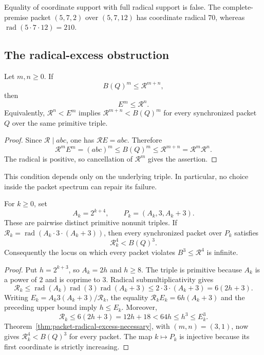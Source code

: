 Equality of coordinate support with full radical support is false.  The
complete-premise packet $(5,7,2)$ over $(5,7,12)$ has coordinate radical
$70$, whereas $\operatorname{rad}(5\cdot7\cdot12)=210$.

\subsection{The radical-excess obstruction}

\begin{theorem}
\label{thm:packet-radical-excess-necessary}
Let $m,n\ge0$.  If
\[
 B(Q)^m\le \mathcal R^{m+n},
\]
then
\[
 E^m\le \mathcal R^n.
\]
Equivalently, $\mathcal R^n<E^m$ implies
$\mathcal R^{m+n}<B(Q)^m$ for every synchronized
packet $Q$ over the same primitive triple.
\end{theorem}

\begin{proof}
Since $\mathcal R\mid abc$, one has $\mathcal R E=abc$.  Therefore
\[
 \mathcal R^mE^m=(abc)^m\le B(Q)^m
 \le \mathcal R^{m+n}=\mathcal R^m\mathcal R^n.
\]
The radical is positive, so cancellation of $\mathcal R^m$ gives the assertion.
\end{proof}

This condition depends only on the underlying triple.  In particular, no
choice inside the packet spectrum can repair its failure.

\begin{theorem}
\label{thm:packet-dyadic-four-thirds}
For $k\ge0$, set
\[
 A_k=2^{k+4},\qquad P_k=(A_k,3,A_k+3).
\]
These are pairwise distinct primitive nonunit triples.  If
$\mathcal R_k=\operatorname{rad}(A_k\cdot3\cdot(A_k+3))$, then every synchronized
packet over $P_k$ satisfies
\[
 \mathcal R_k^4<B(Q)^3.
\]
Consequently the locus on which every packet violates
$B^3\le \mathcal R^4$ is
infinite.
\end{theorem}

\begin{proof}
Put $h=2^{k+3}$, so $A_k=2h$ and $h\ge8$.  The triple is primitive because
$A_k$ is a power of $2$ and is coprime to $3$.  Radical
submultiplicativity gives
\[
 \mathcal R_k\le
 \operatorname{rad}(A_k)\operatorname{rad}(3)
 \operatorname{rad}(A_k+3)
 \le 2\cdot3\cdot(A_k+3)=6(2h+3).
\]
Writing $E_k=A_k3(A_k+3)/\mathcal R_k$, the equality
$\mathcal R_kE_k=6h(A_k+3)$ and the preceding upper bound imply $h\le E_k$.
Moreover,
\[
 \mathcal R_k\le 6(2h+3)=12h+18<64h\le h^3\le E_k^3.
\]
Theorem~\ref{thm:packet-radical-excess-necessary}, with $(m,n)=(3,1)$,
now gives $\mathcal R_k^4<B(Q)^3$ for every packet.  The map $k\mapsto P_k$ is
injective because its first coordinate is strictly increasing.
\end{proof}

